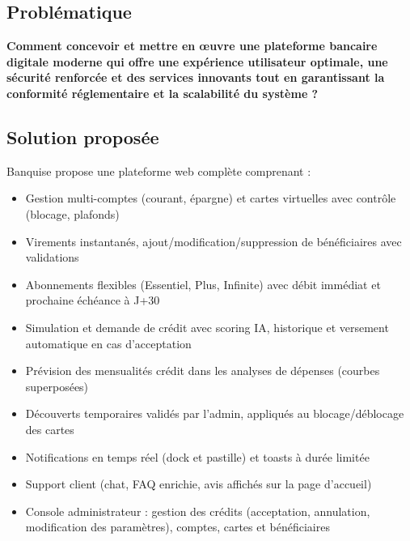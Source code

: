\documentclass[12pt,a4paper]{report}
\begin{document}
\subsection{Problématique}
\textbf{Comment concevoir et mettre en œuvre une plateforme bancaire digitale moderne qui offre une expérience utilisateur optimale, une sécurité renforcée et des services innovants tout en garantissant la conformité réglementaire et la scalabilité du système ?}

\subsection{Solution proposée}
Banquise propose une plateforme web complète comprenant :
\begin{itemize}[leftmargin=1.5cm]
    \item Gestion multi-comptes (courant, épargne) et cartes virtuelles avec contrôle (blocage, plafonds)
    \item Virements instantanés, ajout/modification/suppression de bénéficiaires avec validations
    \item Abonnements flexibles (Essentiel, Plus, Infinite) avec débit immédiat et prochaine échéance à J+30
    \item Simulation et demande de crédit avec scoring IA, historique et versement automatique en cas d'acceptation
    \item Prévision des mensualités crédit dans les analyses de dépenses (courbes superposées)
    \item Découverts temporaires validés par l'admin, appliqués au blocage/déblocage des cartes
    \item Notifications en temps réel (dock et pastille) et toasts à durée limitée
    \item Support client (chat, FAQ enrichie, avis affichés sur la page d'accueil)
    \item Console administrateur : gestion des crédits (acceptation, annulation, modification des paramètres), comptes, cartes et bénéficiaires
\end{itemize}
\end{document}
